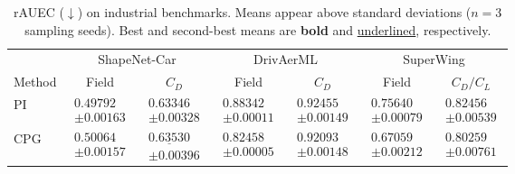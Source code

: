 \begin{table}[!htbp]
    \centering
    \small
    \caption{rAUEC ($\downarrow$) on industrial benchmarks. Means appear above standard deviations ($n=3$ sampling seeds). Best and second-best means are \textbf{bold} and \underline{underlined}, respectively. }
    \label{tab:industrial_benchmarks}
    \setlength{\tabcolsep}{3pt}
    \renewcommand{\arraystretch}{1.12}
    \begin{tabular*}{\textwidth}{@{\extracolsep{\fill}}lcccccc@{}}
        \toprule
        & \multicolumn{2}{c}{ShapeNet-Car} & \multicolumn{2}{c}{DrivAerML} & \multicolumn{2}{c}{SuperWing} \\
        \cmidrule(lr){2-3}\cmidrule(lr){4-5}\cmidrule(lr){6-7}
        Method & Field & $C_D$ & Field & $C_D$ & Field & $C_D/C_L$ \\
        \midrule
        PI & $\begin{gathered}\mathbf{0.49792}\\[-2pt]\pm 0.00163\end{gathered}$ & $\begin{gathered}\mathbf{0.63346}\\[-2pt]\pm 0.00328\end{gathered}$ & $\begin{gathered}0.88342\\[-2pt]\pm 0.00011\end{gathered}$ & $\begin{gathered}0.92455\\[-2pt]\pm 0.00149\end{gathered}$ & $\begin{gathered}0.75640\\[-2pt]\pm 0.00079\end{gathered}$ & $\begin{gathered}0.82456\\[-2pt]\pm 0.00539\end{gathered}$ \\
        \addlinespace[3pt]
        CPG & $\begin{gathered}0.50064\\[-2pt]\pm 0.00157\end{gathered}$ & $\begin{gathered}\underline{0.63530}\\[-2pt]\pm 0.00396\end{gathered}$ & $\begin{gathered}\mathbf{0.82458}\\[-2pt]\pm 0.00005\end{gathered}$ & $\begin{gathered}\mathbf{0.92093}\\[-2pt]\pm 0.00148\end{gathered}$ & $\begin{gathered}\mathbf{0.67059}\\[-2pt]\pm 0.00212\end{gathered}$ & $\begin{gathered}\mathbf{0.80259}\\[-2pt]\pm 0.00761\end{gathered}$ \\

\end{tabular*}
\end{table}
